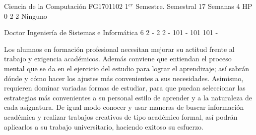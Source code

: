 \documentclass[a4paper,8pt]{article}
\begin{document}
\setNombreProfesor{}
\setGradoProfesorAbreviado{}
\sylabusHeader

\academicaTable
{Ciencia de la Computación} %
{FG1701102} %
{1$^{er}$ Semestre.} %
{Semestral} %
{17 Semanas} %
{} %
{4 HP} %
{0} %
{}  %
{2} %
{2} %
{Ninguno} %

\administrativaTable
{Doctor} %
{Ingeniería de Sistemas e Informática} %
{6} %
{2} %
{-} %
{2} %
{2} %
{-} %
{101} %
{-} %
{101} %
{101} %
{-} %


\begin{fundamentacion}
Los alumnos en formación profesional necesitan mejorar su actitud frente al trabajo y exigencia académicos. Además conviene que entiendan el proceso mental que se da en el ejercicio del estudio para lograr el aprendizaje; así  sabrán dónde y cómo hacer los ajustes más convenientes a sus necesidades. Asimismo, requieren dominar variadas formas de estudiar, para que puedan seleccionar las estrategias  más convenientes a su personal estilo de aprender y a la naturaleza de cada asignatura. De igual modo conocer y usar  maneras de buscar información académica y realizar trabajos creativos de tipo académico formal, así podrán  aplicarlos a su trabajo universitario, haciendo exitoso su esfuerzo.

\end{fundamentacion}

\begin{sumilla}
\item 
\item 
\item 
\item 

\end{sumilla}

\begin{competenciasAsignatura}
\item {}
\item {}

\end{competenciasAsignatura}
\end{document}
